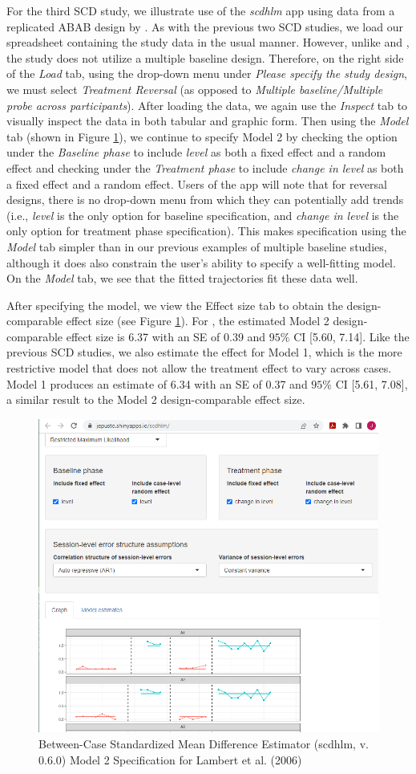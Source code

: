 \documentclass[
]{book}
\begin{document}
For the third SCD study, we illustrate use of the \emph{scdhlm} app using data from a replicated ABAB design by \citet{lambert2006effects}. As with the previous two SCD studies, we load our spreadsheet containing the study data in the usual manner. However, unlike \citet{case1992Improving} and \citet{peltier2020Effects}, the \citet{lambert2006effects} study does not utilize a multiple baseline design. Therefore, on the right side of the \emph{Load} tab, using the drop-down menu under \emph{Please specify the study design}, we must select \emph{Treatment Reversal} (as opposed to \emph{Multiple baseline/Multiple probe across participants}). After loading the data, we again use the \emph{Inspect} tab to visually inspect the data in both tabular and graphic form. Then using the \emph{Model} tab (shown in Figure \ref{fig:Model2-Lambert-2006}), we continue to specify Model 2 by checking the option under the \emph{Baseline phase} to include \emph{level} as both a fixed effect and a random effect and checking under the \emph{Treatment phase} to include \emph{change in level} as both a fixed effect and a random effect. Users of the app will note that for reversal designs, there is no drop-down menu from which they can potentially add trends (i.e., \emph{level} is the only option for baseline specification, and \emph{change in level} is the only option for treatment phase specification). This makes specification using the \emph{Model} tab simpler than in our previous examples of multiple baseline studies, although it does also constrain the user's ability to specify a well-fitting model. On the \emph{Model} tab, we see that the fitted trajectories fit these data well.

After specifying the model, we view the Effect size tab to obtain the design-comparable effect size (see Figure \ref{fig:Model2-Lambert-2006}). For \citet{lambert2006effects}, the estimated Model 2 design-comparable effect size is 6.37 with an SE of 0.39 and \(95\%\) CI {[}5.60, 7.14{]}. Like the previous SCD studies, we also estimate the effect for Model 1, which is the more restrictive model that does not allow the treatment effect to vary across cases. Model 1 produces an estimate of 6.34 with an SE of 0.37 and \(95\%\) CI {[}5.61, 7.08{]}, a similar result to the Model 2 design-comparable effect size.

\begin{figure}
\includegraphics[width=0.5\linewidth,height=0.75\textheight]{images/app.model.model2_Lambert2006} \caption{Between-Case Standardized Mean Difference Estimator (scdhlm, v. 0.6.0) Model 2 Specification for Lambert et al. (2006)}\label{fig:Model2-Lambert-2006}
\end{figure}
\end{document}
